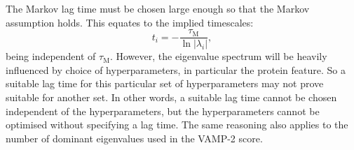 The Markov lag time must be chosen large enough so that the Markov assumption holds. This equates to the implied timescales:
\begin{equation*}
    t_{i}=-\frac{\tau_{\mathrm{M}}}{\ln{|\lambda_{i}|}}, 
\end{equation*} 
being independent of $\tau_{\mathrm{M}}$. However, the eigenvalue spectrum will be heavily influenced by choice of hyperparameters, in particular the protein feature. So a suitable lag time for this particular set of hyperparameters may not prove suitable for another set. In other words, a suitable lag time cannot be chosen independent of the hyperparameters, but the hyperparameters cannot be optimised without specifying a lag time. The same reasoning also applies to the number of dominant eigenvalues used in the VAMP-2 score. 

